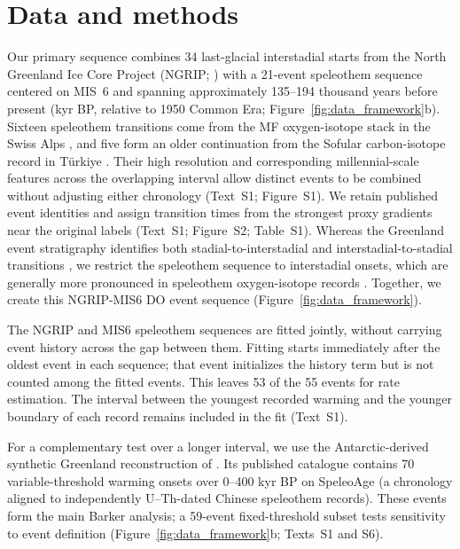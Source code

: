 \documentclass[11pt]{article}
\begin{document}
\section{Data and methods}
Our primary sequence combines 34 last-glacial interstadial starts from the North Greenland Ice Core Project (NGRIP; \citealp{rasmussen2014stratigraphic}) with a 21-event speleothem sequence centered on MIS~6 and spanning approximately 135--194 thousand years before present (kyr BP, relative to 1950 Common Era; Figure~\ref{fig:data_framework}b). Sixteen speleothem transitions come from the MF oxygen-isotope stack in the Swiss Alps \citep{fohlmeister2023role}, and five form an older continuation from the Sofular carbon-isotope record in T\"urkiye \citep{held2024dansgaard}. Their high resolution and corresponding millennial-scale features across the overlapping interval allow distinct events to be combined without adjusting either chronology (Text~S1; Figure~S1). We retain published event identities and assign transition times from the strongest proxy gradients near the original labels (Text~S1; Figure~S2; Table~S1). Whereas the Greenland event stratigraphy identifies both stadial-to-interstadial and interstadial-to-stadial transitions \citep{rasmussen2014stratigraphic}, we restrict the speleothem sequence to interstadial onsets, which are generally more pronounced in speleothem oxygen-isotope records \citep{corrick2020synchronous}. Together, we create this NGRIP-MIS6 DO event sequence (Figure~\ref{fig:data_framework}).

The NGRIP and MIS6 speleothem sequences are fitted jointly, without carrying event history across the gap between them. Fitting starts immediately after the oldest event in each sequence; that event initializes the history term but is not counted among the fitted events. This leaves 53 of the 55 events for rate estimation. The interval between the youngest recorded warming and the younger boundary of each record remains included in the fit (Text~S1).

For a complementary test over a longer interval, we use the Antarctic-derived synthetic Greenland reconstruction of \citet{barker2011800}. Its published catalogue contains 70 variable-threshold warming onsets over 0--400 kyr BP on SpeleoAge (a chronology aligned to independently U--Th-dated Chinese speleothem records). These events form the main Barker analysis; a 59-event fixed-threshold subset tests sensitivity to event definition (Figure~\ref{fig:data_framework}b; Texts~S1 and S6).
\end{document}
